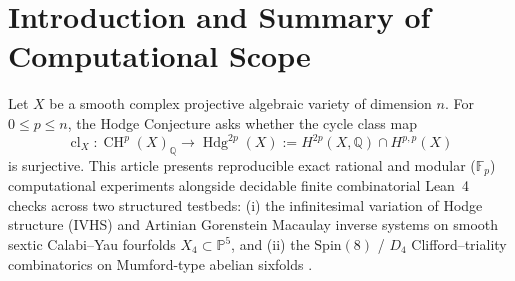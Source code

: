 \documentclass[11pt,a4paper]{amsart}
\theoremstyle{definition}
\theoremstyle{remark}
\DeclareMathOperator{\Hdg}{Hdg}
\DeclareMathOperator{\CH}{CH}
\DeclareMathOperator{\cl}{cl}
\begin{document}
\begin{abstract}
This work presents a comprehensive computational investigation and formal verification suite exploring both testbeds. Using exact rational arithmetic, finite-field linear algebra, and modular reconstruction algorithms, we compute explicit multiplication ranks, verify obstruction cancellation across complete deformation slices, and catalog the combinatorial geometry of spinor weight orbits. In addition, forty-three finite combinatorial and degree-counting identities are verified constructively in core Lean without external mathematical libraries. These results establish constructive algebraic cycle bounds, local colon-ideal factorizations, and representation-theoretic kernel invariants across both testbeds, while effective degree bounds across general deformations and motivic Kuga--Satake cycle realizations remain classical open problems in algebraic geometry.
\end{abstract}

\maketitle

\section{Introduction and Summary of Computational Scope}
\label{sec:intro}

Let $X$ be a smooth complex projective algebraic variety of dimension $n$. For $0 \le p \le n$, the Hodge Conjecture \cite{Deligne2000} asks whether the cycle class map
\[
\cl_X : \CH^p(X)_{\mathbb{Q}} \longrightarrow \Hdg^{2p}(X) := H^{2p}(X, \mathbb{Q}) \cap H^{p,p}(X)
\]
is surjective. This article presents reproducible exact rational and modular ($\mathbb{F}_p$) computational experiments alongside decidable finite combinatorial Lean~4 checks across two structured testbeds: (i) the infinitesimal variation of Hodge structure (IVHS) and Artinian Gorenstein Macaulay inverse systems \cite{CarlsonGriffiths1980,Voisin2002} on smooth sextic Calabi--Yau fourfolds $X_4 \subset \mathbb{P}^5$, and (ii) the $\mathrm{Spin}(8)$ / $D_4$ Clifford--triality combinatorics on Mumford-type abelian sixfolds \cite{Mumford1969,KugaSatake1967,Deligne1982}.
\end{document}
